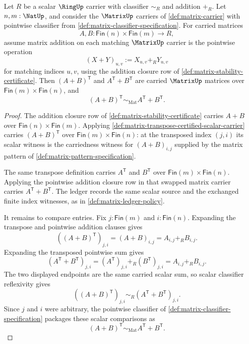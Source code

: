 \begin{theorem}
\label{thm:matrix-transpose-preserves-addition}
Let $R$ be a scalar $\RingUp$ carrier with classifier $\sim_R$ and addition $+_R$. Let $n,m:\NatUp$, and consider the $\MatrixUp$ carriers of \autoref{def:matrix-carrier} with pointwise classifier from \autoref{def:matrix-classifier-specification}. For carried matrices
$$
A,B:\mathsf{Fin}(n)\times\mathsf{Fin}(m)\to R,
$$
assume matrix addition on each matching $\MatrixUp$ carrier is the pointwise operation
$$
(X+Y)_{u,v}:=X_{u,v}+_R Y_{u,v}
$$
for matching indices $u,v$, using the addition closure row of \autoref{def:matrix-stability-certificate}. Then $(A+B)^{\mathsf{T}}$ and $A^{\mathsf{T}}+B^{\mathsf{T}}$ are carried $\MatrixUp$ matrices over $\mathsf{Fin}(m)\times\mathsf{Fin}(n)$, and
$$
(A+B)^{\mathsf{T}}\sim_{\mathrm{Mat}}A^{\mathsf{T}}+B^{\mathsf{T}}.
$$
\end{theorem}
\begin{proof}
The addition closure row of \autoref{def:matrix-stability-certificate} carries $A+B$ over $\mathsf{Fin}(n)\times\mathsf{Fin}(m)$. Applying \autoref{def:matrix-transpose-certified-scalar-carrier} carries $(A+B)^{\mathsf{T}}$ over $\mathsf{Fin}(m)\times\mathsf{Fin}(n)$: at the transposed index $(j,i)$ its scalar witness is the carriedness witness for $(A+B)_{i,j}$ supplied by the matrix pattern of \autoref{def:matrix-pattern-specification}.

The same transpose definition carries $A^{\mathsf{T}}$ and $B^{\mathsf{T}}$ over $\mathsf{Fin}(m)\times\mathsf{Fin}(n)$. Applying the pointwise addition closure row in that swapped matrix carrier carries $A^{\mathsf{T}}+B^{\mathsf{T}}$. The ledger records the same scalar source and the exchanged finite index witnesses, as in \autoref{def:matrix-ledger-policy}.

It remains to compare entries. Fix $j:\mathsf{Fin}(m)$ and $i:\mathsf{Fin}(n)$. Expanding the transpose and pointwise addition clauses gives
$$
((A+B)^{\mathsf{T}})_{j,i}=(A+B)_{i,j}=A_{i,j}+_R B_{i,j}.
$$
Expanding the transposed pointwise sum gives
$$
(A^{\mathsf{T}}+B^{\mathsf{T}})_{j,i}=(A^{\mathsf{T}})_{j,i}+_R(B^{\mathsf{T}})_{j,i}=A_{i,j}+_R B_{i,j}.
$$
The two displayed endpoints are the same carried scalar sum, so scalar classifier reflexivity gives
$$
((A+B)^{\mathsf{T}})_{j,i}
\sim_R
(A^{\mathsf{T}}+B^{\mathsf{T}})_{j,i}.
$$
Since $j$ and $i$ were arbitrary, the pointwise classifier of \autoref{def:matrix-classifier-specification} packages these scalar comparisons as
$$
(A+B)^{\mathsf{T}}\sim_{\mathrm{Mat}}A^{\mathsf{T}}+B^{\mathsf{T}}.
$$
\end{proof}

